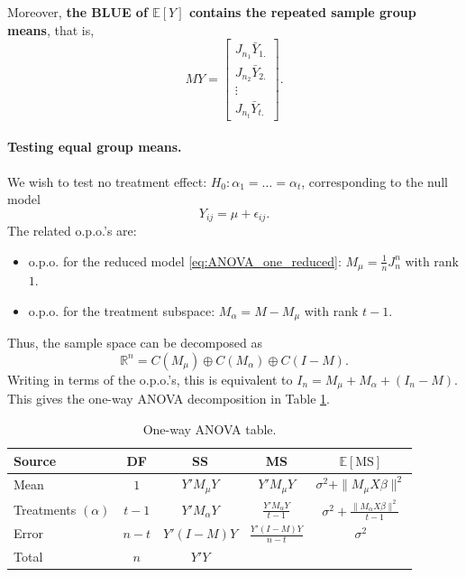 \documentclass{article}
\theoremstyle{break}
\newcommand{\R}{\ensuremath{\mathbb{R}}}
\newcommand{\E}{\ensuremath{\mathbb{E}}}
\begin{document}
Moreover, \textbf{the BLUE of $\E[Y]$ contains the repeated sample group means}, that is, 
\[
MY = 
\begin{bmatrix}
    J_{n_1} \bar{Y}_{1.}\\
    J_{n_2} \bar{Y}_{2.}\\
    \vdots\\
    J_{n_t} \bar{Y}_{t.}
\end{bmatrix}.
\]


\paragraph{Testing equal group means.}\hfill\break
We wish to test no treatment effect: $H_0: \alpha_1 = \ldots = \alpha_t$,
corresponding to the null model
\begin{equation}\label{eq:ANOVA_one_reduced}
    Y_{ij} = \mu + \epsilon_{ij}.
\end{equation}
The related o.p.o.'s are:
\begin{itemize}
    \item o.p.o. for the reduced model \eqref{eq:ANOVA_one_reduced}: $M_\mu = \frac{1}{n}J_n^n$ with rank $1$.
    \item o.p.o. for the treatment subspace: $M_\alpha = M-M_\mu$ with rank $t-1$.
\end{itemize}

Thus, the sample space can be decomposed as 
\[
\R^n = C(M_\mu) \oplus C(M_\alpha) \oplus C(I-M).
\]
Writing in terms of the o.p.o.'s, this is equivalent to $I_n = M_\mu + M_\alpha + (I_n-M)$.
This gives the one-way ANOVA decomposition in Table \ref{tbl:one-way-ANOVA}.

\begin{table}[!h]
\centering
\begin{tabular}{lcccc}
\hline
\textbf{Source} & \textbf{DF} & \textbf{SS} & \textbf{MS} & $\E[\text{MS}]$\\
\hline
Mean & $1$ 
    & $Y'M_\mu Y$ 
    & $Y'M_\mu Y$ 
    & $\sigma^2 + \|M_\mu X \beta\|^2$ \\[6pt]

Treatments $(\alpha)$ 
    & $t-1$ 
    & $Y'M_\alpha Y$ 
    & $\frac{Y'M_\alpha Y}{t-1}$
    & $\sigma^2 + \frac{\|M_\alpha X \beta\|^2}{t-1}$ \\[6pt]

Error 
    & $n - t$ 
    & $Y'(I-M)Y$ 
    & $\frac{Y'(I-M)Y}{n-t}$
    & $\sigma^2$ \\[6pt]

\hline
Total 
    & $n$ 
    & $Y'Y$ 
    & 
    & \\
\hline
\end{tabular}
\caption{One-way ANOVA table.}
\label{tbl:one-way-ANOVA}
\end{table}
\end{document}
